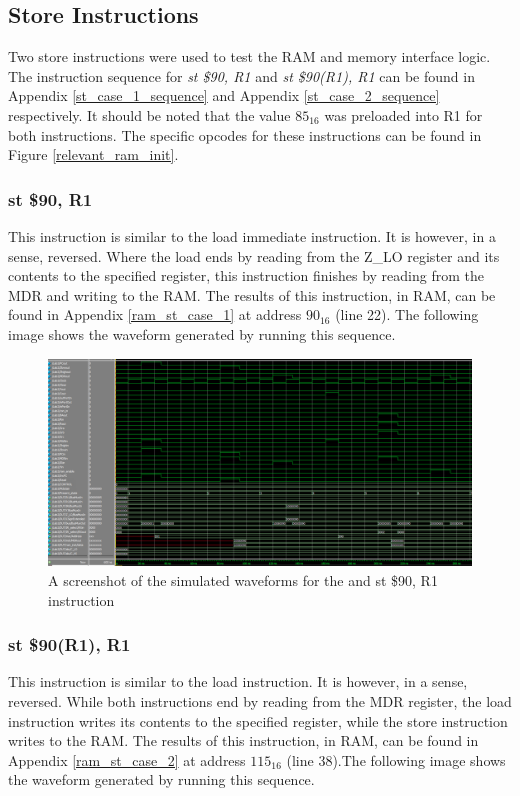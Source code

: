 \documentclass{article}
\begin{document}
    \subsection{Store Instructions}
        Two store instructions were used to test the RAM and memory interface logic. The instruction sequence for \emph{st \$90, R1} and \emph{st \$90(R1), R1} can be found in Appendix \ref{st_case_1_sequence} and Appendix \ref{st_case_2_sequence} respectively. It should be noted that the value $85_{16}$ was preloaded into R1 for both instructions. The specific opcodes for these instructions can be found in Figure \ref{relevant_ram_init}. 
        
        \subsubsection{st \$90, R1}
            This instruction is similar to the load immediate instruction. It is however, in a sense, reversed. Where the load ends by reading from the Z\_LO register and its contents to the specified register, this instruction finishes by reading from the MDR and writing to the RAM. The results of this instruction, in RAM, can be found in Appendix \ref{ram_st_case_1} at address $90_{16}$ (line 22). The following image shows the waveform generated by running this sequence. 

            \begin{figure}[h!]
                \begin{center}
                    \includegraphics[width=15cm]{st_case_1_wave.png}
                    \caption{A screenshot of the simulated waveforms for the and st \$90, R1 instruction}
                \end{center}
            \end{figure}

        \subsubsection{st \$90(R1), R1}
            This instruction is similar to the load instruction. It is however, in a sense, reversed. While both instructions end by reading from the MDR register, the load instruction writes its contents to the specified register, while the store instruction writes to the RAM. The results of this instruction, in RAM, can be found in Appendix \ref{ram_st_case_2} at address $115_{16}$ (line 38).The following image shows the waveform generated by running this sequence. 
\end{document}
